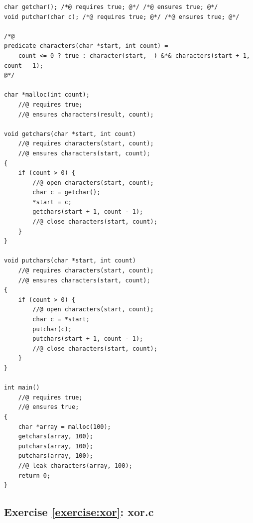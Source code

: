 \documentclass{article}
\begin{document}
\begin{lstlisting}
char getchar(); /*@ requires true; @*/ /*@ ensures true; @*/
void putchar(char c); /*@ requires true; @*/ /*@ ensures true; @*/

/*@
predicate characters(char *start, int count) =
    count <= 0 ? true : character(start, _) &*& characters(start + 1, count - 1);
@*/

char *malloc(int count);
    //@ requires true;
    //@ ensures characters(result, count);

void getchars(char *start, int count)
    //@ requires characters(start, count);
    //@ ensures characters(start, count);
{
    if (count > 0) {
        //@ open characters(start, count);
        char c = getchar();
        *start = c;
        getchars(start + 1, count - 1);
        //@ close characters(start, count);
    }
}

void putchars(char *start, int count)
    //@ requires characters(start, count);
    //@ ensures characters(start, count);
{
    if (count > 0) {
        //@ open characters(start, count);
        char c = *start;
        putchar(c);
        putchars(start + 1, count - 1);
        //@ close characters(start, count);
    }
}

int main()
    //@ requires true;
    //@ ensures true;
{
    char *array = malloc(100);
    getchars(array, 100);
    putchars(array, 100);
    putchars(array, 100);
    //@ leak characters(array, 100);
    return 0;
}
\end{lstlisting}

\subsection{Exercise \ref{exercise:xor}: xor.c}\label{solution:xor}
\end{document}
